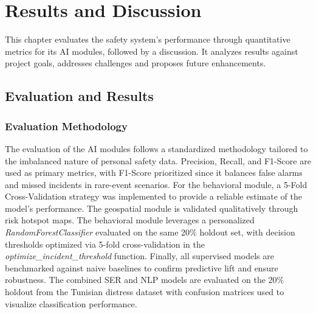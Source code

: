 \documentclass[12pt,a4paper,oneside,english]{book}
\begin{document}
\chapter{Results and Discussion}
\label{ch:results_and_disc}

This chapter evaluates the safety system's performance through quantitative metrics for its AI modules, followed by a discussion. 
It analyzes results against project goals, addresses challenges and proposes future enhancements.
\section{Evaluation and Results}
\label{sec:results}

    \subsection{Evaluation Methodology}
    \label{subsec:eval_methodology}


The evaluation of the AI modules follows a standardized methodology tailored to the imbalanced nature of personal safety data. 
Precision, Recall, and F1-Score are used as primary metrics, with F1-Score prioritized since it balances false alarms and missed incidents in rare-event scenarios. 
For the behavioral module, a 5-Fold Cross-Validation strategy was implemented to provide a reliable estimate of the model's performance.
The geospatial module is validated qualitatively through risk hotspot maps. %
The behavioral module leverages a personalized \textit{RandomForestClassifier} evaluated on the same 20\% holdout set, with decision thresholds optimized via 5-fold cross-validation in the \textit{optimize\_incident\_threshold} function. Finally, all supervised models are benchmarked against naive baselines to confirm predictive lift and ensure robustness.
The combined SER and NLP models are evaluated on the 20\% holdout from the Tunisian distress dataset with confusion matrices used to visualize classification performance.
\end{document}
